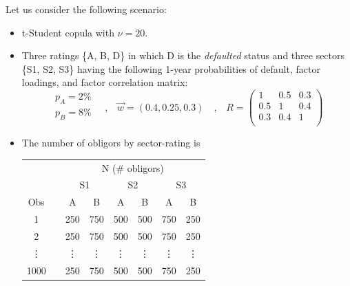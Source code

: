 \documentclass[11pt,fleqn]{book} %
\begin{document}
\begin{example}
	\label{ex:calib}
	Let us consider the following scenario:
	\begin{itemize}
		\item t-Student copula with $\nu=20$.
		\item Three ratings \{A, B, D\} in which D is the \emph{defaulted} status 
		and three sectors \{S1, S2, S3\} having the following 1-year probabilities 
		of default, factor loadings, and factor correlation matrix:
		\begin{displaymath}
			\begin{array}{l}
				p_A=2\%     \\
				p_B=8\%     \\
			\end{array}
			\quad \text{,} \quad
			\vec{w} = (0.4, 0.25, 0.3)
			\quad \text{,} \quad
			R = \left(
			\begin{array}{ccc}
				1 & 0.5 & 0.3 \\
				0.5 & 1 & 0.4 \\
				0.3 & 0.4 & 1 \\
			\end{array}
			\right) 
		\end{displaymath}
		\item The number of obligors by sector-rating is\\
		\newline
		\hspace*{1cm}
		\small
		\begin{tabular}{cc|c|c||c|c||c|c|}
			\cline{3-8}
			& & \multicolumn{6}{|c|}{N (\# obligors)} \\
			\cline{3-8}
			& & \multicolumn{2}{|c||}{S1} & \multicolumn{2}{|c||}{S2} & \multicolumn{2}{|c|}{S3} \\
			\cline{1-1} \cline{3-8}
			\multicolumn{1}{|c|}{Obs} & & A & B & A & B & A & B \\
			\cline{1-1} \cline{3-8}
			\multicolumn{1}{|c|}{1} & & 250 & 750 & 500 & 500 & 750 & 250 \\
			\cline{1-1} \cline{3-8}
			\multicolumn{1}{|c|}{2} & & 250 & 750 & 500 & 500 & 750 & 250 \\
			\cline{1-1} \cline{3-8}
			\multicolumn{1}{|c|}{\vdots} & & \vdots & \vdots & \vdots & \vdots & \vdots & \vdots \\
			\cline{1-1} \cline{3-8}
			\multicolumn{1}{|c|}{1000} & & 250 & 750 & 500 & 500 & 750 & 250 \\
			\cline{1-1} \cline{3-8}
		\end{tabular}
	\end{itemize}
	\vspace{11pt}


\end{example}
\end{document}

